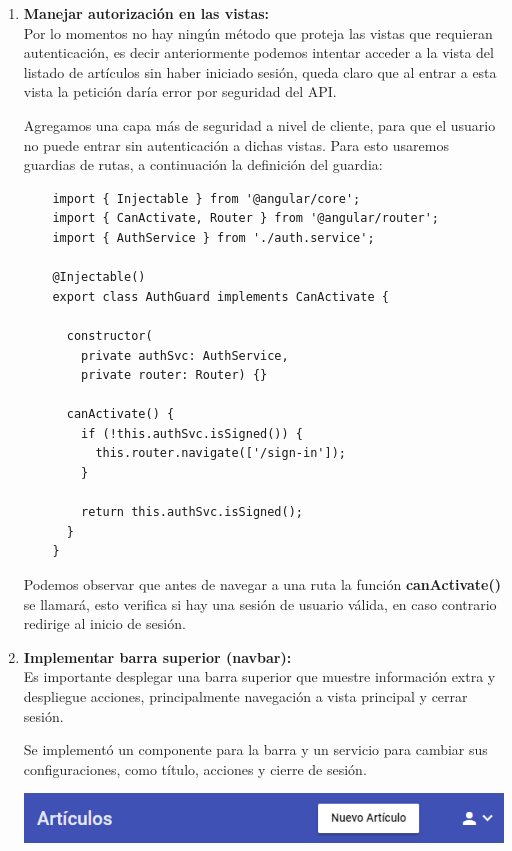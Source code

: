 \begin{enumerate}
  \item\textbf{Manejar autorización en las vistas:}\\
  
  Por lo momentos no hay ningún método que proteja las vistas que requieran autenticación, es decir anteriormente podemos intentar acceder a la vista del listado de artículos sin haber iniciado sesión, queda claro que al entrar a esta vista la petición daría error por seguridad del API.
  
  Agregamos una capa más de seguridad a nivel de cliente, para que el usuario no puede entrar sin autenticación a dichas vistas. Para esto usaremos guardias de rutas, a continuación la definición del guardia:
  \begin{verbatim}
    import { Injectable } from '@angular/core';
    import { CanActivate, Router } from '@angular/router';
    import { AuthService } from './auth.service';
    
    @Injectable()
    export class AuthGuard implements CanActivate {
    
      constructor(
        private authSvc: AuthService,
        private router: Router) {}
    
      canActivate() {
        if (!this.authSvc.isSigned()) {
          this.router.navigate(['/sign-in']);
        }
    
        return this.authSvc.isSigned();
      }
    }
  \end{verbatim}
  
  Podemos observar que antes de navegar a una ruta la función \textbf{canActivate()} se llamará, esto verifica si hay una sesión de usuario válida, en caso contrario redirige al inicio de sesión.

  \item\textbf{Implementar barra superior (navbar):}\\

  Es importante desplegar una barra superior que muestre información extra y despliegue acciones, principalmente navegación a vista principal y cerrar sesión.
  
  
  Se implementó un componente para la barra y un servicio para cambiar sus configuraciones, como título, acciones y cierre de sesión.
  
  \begin{center}
      \bigbreak
      \includegraphics[scale=0.6]{images/marco_aplicativo/navbar.png}
      \label{fig:navbar}
      \bigbreak
  \end{center} 
  

\end{enumerate}

